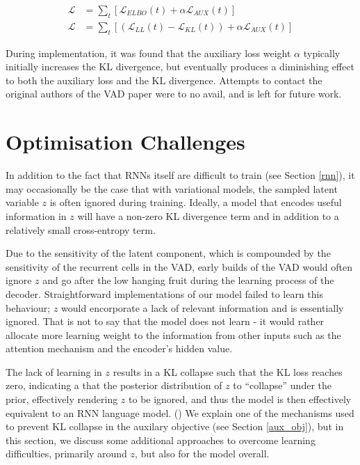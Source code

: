 \documentclass[12pt,twoside]{report}
\begin{document}
\begin{equation}
	\begin{split}
		\mathcal{L} &= \sum_t [\mathcal{L}_{ELBO}(t) + \alpha \mathcal{L}_{AUX}(t)] \\
		\mathcal{L} &= \sum_t [(\mathcal{L}_{LL}(t) - \mathcal{L}_{KL}(t)) + \alpha \mathcal{L}_{AUX}(t)] 
	\end{split}
\end{equation}

During implementation, it was found that the auxiliary loss weight $\alpha$ typically initially increases the KL divergence, but eventually produces a diminishing effect to both the auxiliary loss and the KL divergence. Attempts to contact the original authors of the VAD paper were to no avail, and is left for future work. 
 

\section{Optimisation Challenges}
\label{optimisation_challenges}

In addition to the fact that RNNs itself are difficult to train (see Section \ref{rnn}), it may occasionally be the case that with variational models, the sampled latent variable $z$ is often ignored during training. Ideally, a model that encodes useful information in $z$ will have a non-zero KL divergence term and in addition to a relatively small cross-entropy term. 

Due to the sensitivity of the latent component, which is compounded by the sensitivity of the recurrent cells in the VAD, early builds of the VAD would often ignore $z$ and go after the low hanging fruit during the learning process of the decoder. Straightforward implementations of our model failed to learn this behaviour; $z$ would encorporate a lack of relevant information and is essentially ignored. That is not to say that the model does not learn - it would rather allocate more learning weight to the information from other inputs such as the attention mechanism and the encoder's hidden value.

The lack of learning in $z$ results in a KL collapse such that the KL loss reaches zero, indicating a that the posterior distribution of $z$ to ``collapse'' under the prior, effectively rendering $z$ to be ignored, and thus the model is then effectively equivalent to an RNN language model. (\cite{bowman_generating_2015}) We explain one of the mechanisms used to prevent KL collapse in the auxilary objective (see Section \ref{aux_obj}), but in this section, we discuss some additional approaches to overcome learning difficulties, primarily around $z$, but also for the model overall.
\end{document}
